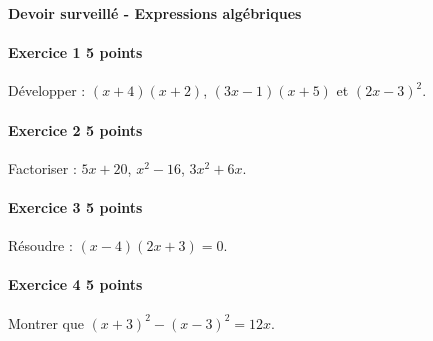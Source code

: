 \documentclass[a4paper,10pt]{article}
\newenvironment{exercice}[2]{\paragraph{Exercice #1 \hfill #2 points}\mbox{}\par}{\medskip}
\begin{document}
\begin{center}\Large\bfseries Devoir surveillé - Expressions algébriques\end{center}
\vspace{2mm}
\begin{exercice}{1}{5}Développer : $(x+4)(x+2)$, $(3x-1)(x+5)$ et $(2x-3)^2$.\end{exercice}\begin{exercice}{2}{5}Factoriser : $5x+20$, $x^2-16$, $3x^2+6x$.\end{exercice}\begin{exercice}{3}{5}Résoudre : $(x-4)(2x+3)=0$.\end{exercice}\begin{exercice}{4}{5}Montrer que $(x+3)^2-(x-3)^2=12x$.\end{exercice}
\end{document}
